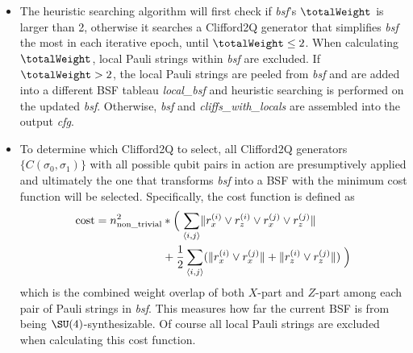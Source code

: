 \begin{itemize}
    \item The heuristic searching algorithm will first check if \textit{bsf}'s $\totalWeight$ is larger than 2, otherwise it searches a Clifford2Q generator that simplifies \textit{bsf} the most in each iterative epoch, until $\totalWeight \leq 2$. When calculating $\totalWeight$, local Pauli strings within \textit{bsf} are excluded. If $\totalWeight > 2$, the local Pauli strings are peeled from \textit{bsf} and are added into a different BSF tableau \textit{local\_bsf} and heuristic searching is performed on the updated \textit{bsf}. Otherwise, \textit{bsf} and \textit{cliffs\_with\_locals} are assembled into the output \textit{cfg}.
    \item To determine which Clifford2Q to select, all Clifford2Q generators $\{C(\sigma_0, \sigma_1)\}$ with all possible qubit pairs in action are presumptively applied and ultimately the one that transforms \textit{bsf} into a BSF with the minimum cost function will be selected. Specifically, the cost function is defined as
    \begin{align*}
        \textrm{cost} =  n_\textrm{non\_trivial}^2 &* \left(\vphantom{\sum}\right. \sum_{\langle i,j \rangle} \lVert r_x^{(i)} \lor r_z^{(i)} \lor r_x^{(j)} \lor r_z^{(j)} \rVert  \\
        & + \frac{1}{2} \sum_{\langle i,j \rangle} (\lVert r_x^{(i)} \lor r_x^{(j)} \rVert + \lVert r_z^{(i)} \lor r_z^{(j)} \rVert)\left.\vphantom{\sum}\right)
    \end{align*}
    which is the combined weight overlap of both $X$-part and $Z$-part among each pair of Pauli strings in \textit{bsf}. This measures how far the current BSF is from being $\SU(4)$-synthesizable.
    Of course all local Pauli strings are excluded when calculating this cost function. 
\end{itemize}

